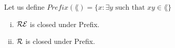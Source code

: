 Let us define $Prefix(\lang) = \{x : \exists y \text{ such that } xy \in \lang\}$

\begin{enumerate}[i.]
    \item $\mathcal{R}\mathcal{E}$ is closed under Prefix.


    \item $\mathcal{R}$ is closed under Prefix.


\end{enumerate}